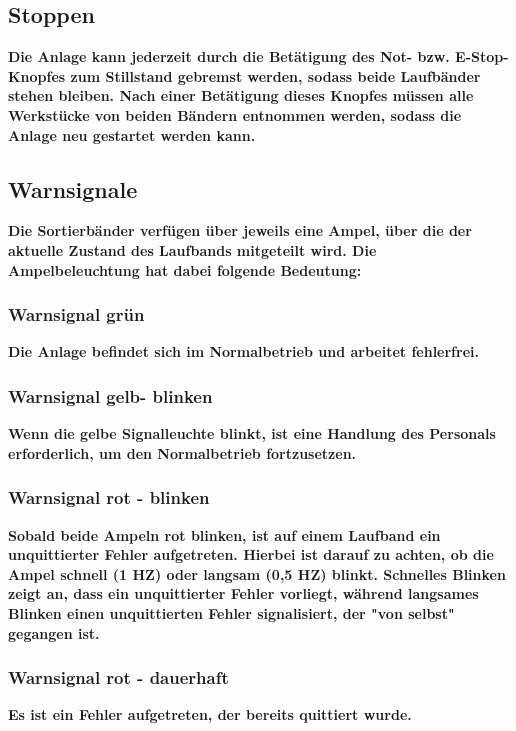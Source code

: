 \documentclass[oneside,a4paper,titlepage]{scrartcl} %
\begin{document}
\subsection{Stoppen}
\textbf{Die Anlage kann jederzeit durch die Betätigung des Not- bzw. E-Stop-Knopfes zum Stillstand gebremst werden, sodass beide Laufbänder stehen bleiben.\newline
Nach einer Betätigung dieses Knopfes müssen alle Werkstücke von beiden Bändern entnommen werden, sodass die Anlage neu gestartet werden kann.}

\subsection{Warnsignale}
\textbf{Die Sortierbänder verfügen über jeweils eine Ampel, über die der aktuelle Zustand des Laufbands mitgeteilt wird. Die Ampelbeleuchtung hat dabei folgende Bedeutung: }

\subsubsection{Warnsignal grün}
\textbf{Die Anlage befindet sich im Normalbetrieb und arbeitet fehlerfrei.}

\subsubsection{Warnsignal gelb- blinken}
\textbf{Wenn die gelbe Signalleuchte blinkt, ist eine Handlung des Personals erforderlich, um den Normalbetrieb fortzusetzen.}
\newline

\subsubsection{Warnsignal rot - blinken}
\textbf{Sobald beide Ampeln rot blinken, ist auf einem Laufband ein unquittierter Fehler aufgetreten. Hierbei ist darauf zu achten, ob die Ampel schnell (1 HZ) oder langsam (0,5 HZ) blinkt. \newline
Schnelles Blinken zeigt an, dass ein unquittierter Fehler vorliegt, \newline
während langsames Blinken einen unquittierten Fehler signalisiert, der "von selbst" gegangen ist.}\newline

\subsubsection{Warnsignal rot - dauerhaft}
\textbf{Es ist ein Fehler aufgetreten, der bereits quittiert wurde.}
\newline
\newline
\end{document}
